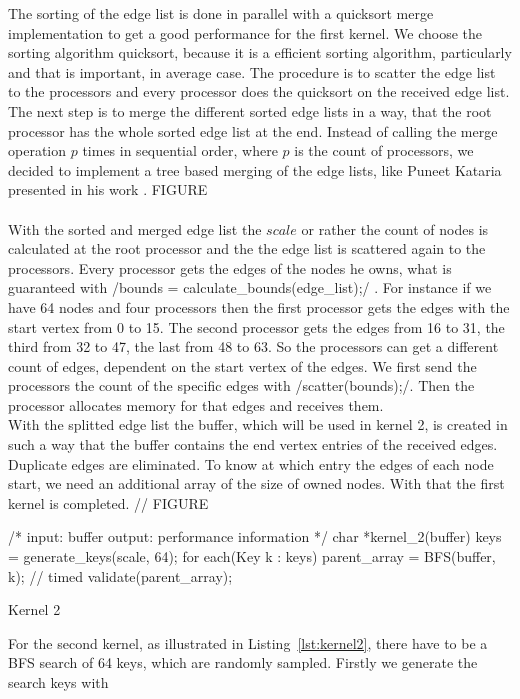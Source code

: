 \documentclass[12pt,a4paper]{article}
\begin{document}
The sorting of the edge list is done in parallel with a quicksort merge implementation to get a good performance for the first kernel. We choose the sorting algorithm quicksort, because it is a efficient sorting algorithm, particularly and that is important, in average case. The procedure is to scatter the edge list to the processors and every processor does the quicksort on the received edge list. The next step is to merge the different sorted edge lists in a way, that the root processor has the whole sorted edge list at the end. Instead of calling the merge operation \(p\) times in sequential order, where \(p\) is the count of processors, we decided to implement a tree based merging of the edge lists, like Puneet Kataria presented in his work \cite{quickmerge}. FIGURE\\\\
With the sorted and merged edge list the \(scale\) or rather the count of nodes is calculated at the root processor and the the edge list is scattered again to the processors. Every processor gets the edges of the nodes he owns, what is guaranteed with \cinline/bounds = calculate_bounds(edge_list);/ . For instance if we have 64 nodes and four processors then the first processor gets the edges with the start vertex from 0 to 15. The second processor gets the edges from 16 to 31, the third from 32 to 47, the last from 48 to 63. So the processors can get a different count of edges, dependent on the start vertex of the edges. We first send the processors the count of the specific edges with \cinline/scatter(bounds);/. Then the processor allocates memory for that edges and receives them. \\
With the splitted edge list the buffer, which will be used in kernel 2, is created in such a way that the buffer contains the end vertex entries of the received edges. Duplicate edges are eliminated. To know at which entry the edges of each node start, we need an additional array of the size of owned nodes. With that the first kernel is completed. // FIGURE \\
\begin{listing}[H]
\begin{ccode}
/*
input: buffer 
output: performance information
*/
char *kernel_2(buffer){
	keys = generate_keys(scale, 64);
	for each(Key k : keys){
		parent_array = BFS(buffer, k); // timed
		validate(parent_array);
	}
}
\end{ccode}
\caption{Kernel 2}
\label{lst:kernel2}
\end{listing}
For the second kernel, as illustrated in Listing~\ref{lst:kernel2}, there have to be a BFS search of 64 keys, which are randomly sampled. Firstly we generate the search keys with 
\end{document}
